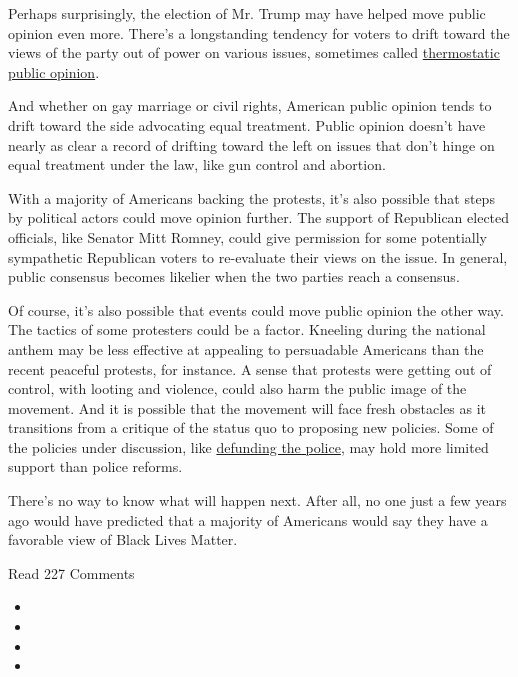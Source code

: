 Perhaps surprisingly, the election of Mr. Trump may have helped move
public opinion even more. There's a longstanding tendency for voters to
drift toward the views of the party out of power on various issues,
sometimes called
\href{https://pages.uncc.edu/mary-atkinson/wp-content/uploads/sites/619/2014/02/BeyondThermostat.pdf}{thermostatic
public opinion}.

And whether on gay marriage or civil rights, American public opinion
tends to drift toward the side advocating equal treatment. Public
opinion doesn't have nearly as clear a record of drifting toward the
left on issues that don't hinge on equal treatment under the law, like
gun control and abortion.

With a majority of Americans backing the protests, it's also possible
that steps by political actors could move opinion further. The support
of Republican elected officials, like Senator Mitt Romney, could give
permission for some potentially sympathetic Republican voters to
re-evaluate their views on the issue. In general, public consensus
becomes likelier when the two parties reach a consensus.

Of course, it's also possible that events could move public opinion the
other way. The tactics of some protesters could be a factor. Kneeling
during the national anthem may be less effective at appealing to
persuadable Americans than the recent peaceful protests, for instance. A
sense that protests were getting out of control, with looting and
violence, could also harm the public image of the movement. And it is
possible that the movement will face fresh obstacles as it transitions
from a critique of the status quo to proposing new policies. Some of the
policies under discussion, like
\href{https://www.nytimes3xbfgragh.onion/2020/06/08/us/what-does-defund-police-mean.html}{defunding
the police}, may hold more limited support than police reforms.

There's no way to know what will happen next. After all, no one just a
few years ago would have predicted that a majority of Americans would
say they have a favorable view of Black Lives Matter.

Read 227 Comments

\begin{itemize}
\item
\item
\item
\item
\end{itemize}

